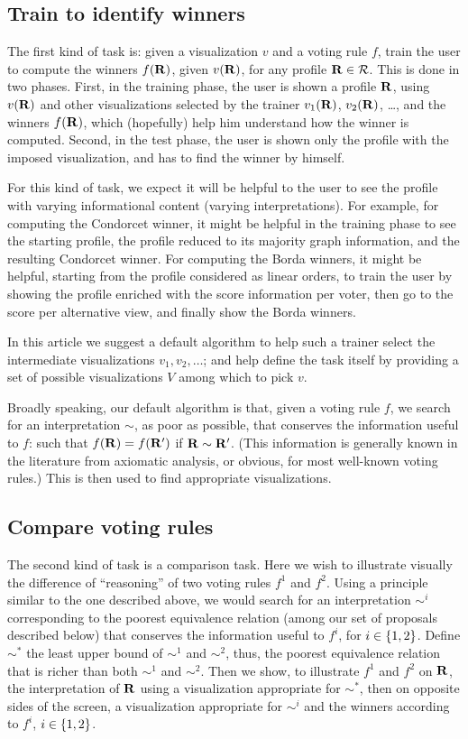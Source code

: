 \documentclass[version=last, pagesize, twoside=off, bibliography=totoc, DIV=calc, fontsize=12pt, a4paper, french, english]{scrartcl}
\begin{document}
\subsection{Train to identify winners}
The first kind of task is: given a visualization $v$ and a voting rule $f$, train the user to compute the winners $f(\mathbf{R})$, given $v(\mathbf{R})$, for any profile $\mathbf{R} \in \mathcal{R}$. This is done in two phases. First, in the training phase, the user is shown a profile $\mathbf{R}$, using $v(\mathbf{R})$ and other visualizations selected by the trainer $v_1(\mathbf{R})$, $v_2(\mathbf{R})$, …, and the winners $f(\mathbf{R})$, which (hopefully) help him understand how the winner is computed. Second, in the test phase, the user is shown only the profile with the imposed visualization, and has to find the winner by himself.

For this kind of task, we expect it will be helpful to the user to see the profile with varying informational content (varying interpretations). For example, for computing the Condorcet winner, it might be helpful in the training phase to see the starting profile, the profile reduced to its majority graph information, and the resulting Condorcet winner. For computing the Borda winners, it might be helpful, starting from the profile considered as linear orders, to train the user by showing the profile enriched with the score information per voter, then go to the score per alternative view, and finally show the Borda winners.

In this article we suggest a default algorithm to help such a trainer select the intermediate visualizations $v_1, v_2, …$; and help define the task itself by providing a set of possible visualizations $V$ among which to pick $v$.

Broadly speaking, our default algorithm is that, given a voting rule $f$, we search for an interpretation $\sim$, as poor as possible, that conserves the information useful to $f$: such that $f(\mathbf{R}) = f(\mathbf{R}')$ if $\mathbf{R} \sim \mathbf{R}'$. (This information is generally known in the literature from axiomatic analysis, or obvious, for most well-known voting rules.) This is then used to find appropriate visualizations.

\subsection{Compare voting rules}
The second kind of task is a comparison task.  Here we wish to illustrate visually the difference of “reasoning” of two voting rules $f^1$ and $f^2$. Using a principle similar to the one described above, we would search for an interpretation $\sim^i$ corresponding to the poorest equivalence relation (among our set of proposals described below) that conserves the information useful to $f^i$, for $i \in \left\{1, 2\right\}$. Define $\sim^*$ the least upper bound of $\sim^1$ and $\sim^2$, thus, the poorest equivalence relation that is richer than both $\sim^1$ and $\sim^2$. Then we show, to illustrate $f^1$ and $f^2$ on $\mathbf{R}$, the interpretation of $\mathbf{R}$ using a visualization appropriate for $\sim^*$, then on opposite sides of the screen, a visualization appropriate for $\sim^i$ and the winners according to $f^i$, $i \in \left\{1, 2\right\}$. 
\end{document}

